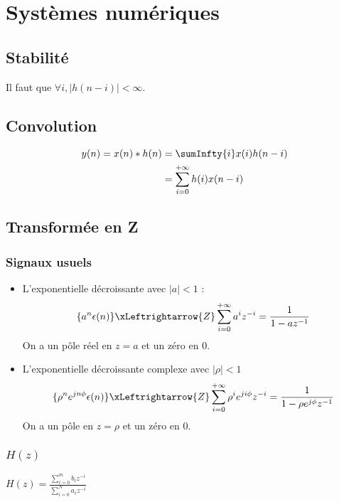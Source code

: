 \section{Systèmes numériques}
    \subsection{Stabilité}
        Il faut que $\forall i, |h(n-i)| < \infty$.

    \subsection{Convolution}\label{subsec:convolution}
        \begin{align*}
            y(n) = x(n) * h(n) &= \sumInfty{i} x(i) h(n-i)\\
                               &= \sum_{i=0}^{+\infty} h(i) x(n-i) 
        \end{align*}

    \subsection{Transformée en Z}
        \subsubsection{Signaux usuels}
            \begin{itemize}
                \item L'exponentielle décroissante avec $|a| < 1$ :
                $$\{a^n \epsilon(n)\} \xLeftrightarrow{Z} \sum_{i=0}^{+\infty} a^i z^{-i} = \frac{1}{1 - az^{-1}}$$
                On a un pôle réel en $z = a$ et un zéro en $0$.
                \item L'exponentielle décroissante complexe avec $|\rho| < 1$
                $$\{\rho^n e^{jn\phi} \epsilon(n)\} \xLeftrightarrow{Z} \sum_{i=0}^{+\infty} \rho^i e^{ji\phi} z^{-i} = \frac{1}{1-\rho e^{j\phi} z^{-1}}$$
                On a un pôle en $z = \rho$ et un zéro en $0$.
            \end{itemize}

        \subsubsection{$H(z)$}
            $H(z) = \frac{\sum\limits_{i=0}^m b_iz^{-i}}{\sum\limits_{i=0}^N a_iz^{-i}}$